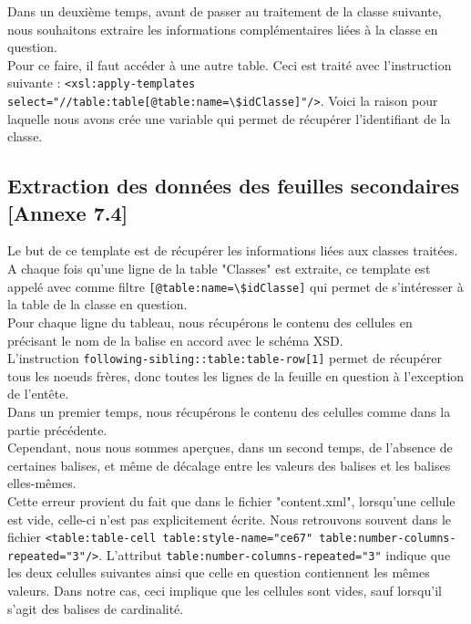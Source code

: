 \documentclass[11pt]{report}
\begin{document}
Dans un deuxième temps, avant de passer au traitement de la classe suivante, nous souhaitons extraire les informations complémentaires liées à la classe en question.\\
Pour ce faire, il faut accéder à une autre table. Ceci est traité avec l'instruction suivante : \lstinline{<xsl:apply-templates select="//table:table[@table:name=\$idClasse]"/>}.
Voici la raison pour laquelle nous avons crée une variable qui permet de récupérer l'identifiant de la classe.


\subsection{Extraction des données des feuilles secondaires [Annexe 7.4] }

Le but de ce template est de récupérer les informations liées aux classes traitées. \\
A chaque fois qu'une ligne de la table "Classes" est extraite, ce template est appelé avec comme filtre \lstinline{[@table:name=\$idClasse]} qui permet de s'intéresser à la table de la classe en question.\\

Pour chaque ligne du tableau, nous récupérons le contenu des cellules en précisant le nom de la balise en accord avec le schéma XSD.\\
L'instruction \lstinline{following-sibling::table:table-row[1]} permet de récupérer tous les noeuds frères, donc toutes les lignes de la feuille en question à l'exception de l'entête. \\
Dans un premier temps, nous récupérons le contenu des celulles comme dans la partie précédente.\\

Cependant, nous nous sommes aperçues, dans un second temps, de l'absence de certaines balises, et même de décalage entre les valeurs des balises et les balises elles-mêmes.\\
Cette erreur provient du fait que dans le fichier "content.xml", lorsqu'une cellule est vide, celle-ci n'est pas explicitement écrite. Nous retrouvons souvent dans le fichier \lstinline{<table:table-cell table:style-name="ce67" table:number-columns-repeated="3"/>}. L'attribut \lstinline{table:number-columns-repeated="3"} indique que les deux celulles suivantes ainsi que celle en question contiennent les mêmes valeurs. Dans notre cas, ceci implique que les cellules sont vides, sauf lorsqu'il s'agit des balises de cardinalité.\\
\end{document}
